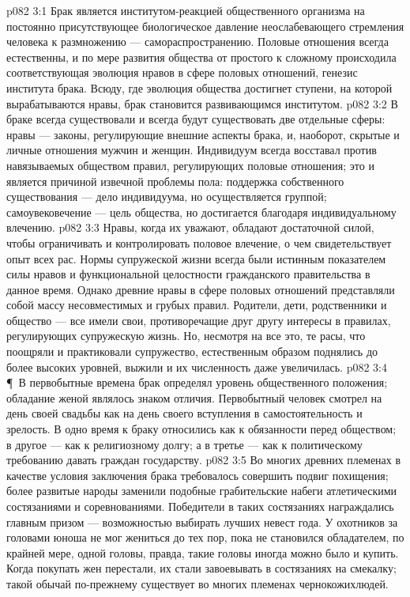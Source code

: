 \vs p082 3:1 Брак является институтом\hyp{}реакцией общественного организма на постоянно присутствующее биологическое давление неослабевающего стремления человека к размножению --- самораспространению. Половые отношения всегда естественны, и по мере развития общества от простого к сложному происходила соответствующая эволюция нравов в сфере половых отношений, генезис института брака. Всюду, где эволюция общества достигнет ступени, на которой вырабатываются нравы, брак становится развивающимся институтом.
\vs p082 3:2 В браке всегда существовали и всегда будут существовать две отдельные сферы: нравы --- законы, регулирующие внешние аспекты брака, и, наоборот, скрытые и личные отношения мужчин и женщин. Индивидуум всегда восставал против навязываемых обществом правил, регулирующих половые отношения; это и является причиной извечной проблемы пола: поддержка собственного существования --- дело индивидуума, но осуществляется группой; самоувековечение --- цель общества, но достигается благодаря индивидуальному влечению.
\vs p082 3:3 Нравы, когда их уважают, обладают достаточной силой, чтобы ограничивать и контролировать половое влечение, о чем свидетельствует опыт всех рас. Нормы супружеской жизни всегда были истинным показателем силы нравов и функциональной целостности гражданского правительства в данное время. Однако древние нравы в сфере половых отношений представляли собой массу несовместимых и грубых правил. Родители, дети, родственники и общество --- все имели свои, противоречащие друг другу интересы в правилах, регулирующих супружескую жизнь. Но, несмотря на все это, те расы, что поощряли и практиковали супружество, естественным образом поднялись до более высоких уровней, выжили и их численность даже увеличилась.
\vs p082 3:4 \P\ В первобытные времена брак определял уровень общественного положения; обладание женой являлось знаком отличия. Первобытный человек смотрел на день своей свадьбы как на день своего вступления в самостоятельность и зрелость. В одно время к браку относились как к обязанности перед обществом; в другое --- как к религиозному долгу; а в третье --- как к политическому требованию давать граждан государству.
\vs p082 3:5 Во многих древних племенах в качестве условия заключения брака требовалось совершить подвиг похищения; более развитые народы заменили подобные грабительские набеги атлетическими состязаниями и соревнованиями. Победители в таких состязаниях награждались главным призом --- возможностью выбирать лучших невест года. У охотников за головами юноша не мог жениться до тех пор, пока не становился обладателем, по крайней мере, одной головы, правда, такие головы иногда можно было и купить. Когда покупать жен перестали, их стали завоевывать в состязаниях на смекалку; такой обычай по\hyp{}прежнему существует во многих племенах чернокожихлюдей.

